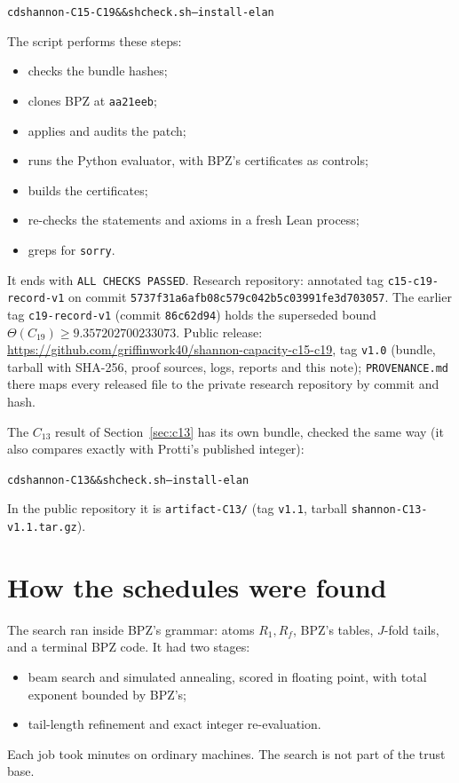 \documentclass[11pt]{amsart}
\newcommand{\T}{\Theta}
\newcommand{\code}[1]{\texttt{#1}}
\begin{document}
\begin{alltt}\small
cd shannon-C15-C19 && sh check.sh --install-elan
\end{alltt}
The script performs these steps:
\begin{itemize}
\item checks the bundle hashes;
\item clones BPZ at \code{aa21eeb};
\item applies and audits the patch;
\item runs the Python evaluator, with BPZ's certificates as controls;
\item builds the certificates;
\item re-checks the statements and axioms in a fresh Lean process;
\item greps for \code{sorry}.
\end{itemize}
It ends with \code{ALL CHECKS PASSED}. Research repository: annotated tag
\code{c15-c19-record-v1} on commit \code{5737f31a6afb08c579c042b5c03991fe3d703057}. The earlier
tag \code{c19-record-v1} (commit \code{86c62d94}) holds the superseded bound
$\T(C_{19})\ge 9.357202700233073$. Public release:
\url{https://github.com/griffinwork40/shannon-capacity-c15-c19}, tag \code{v1.0} (bundle, tarball
with SHA-256, proof sources, logs, reports and this note); \code{PROVENANCE.md} there maps every
released file to the private research repository by commit and hash.

The $C_{13}$ result of Section~\ref{sec:c13} has its own bundle, checked the same way (it also
compares exactly with Protti's published integer):
\begin{alltt}\small
cd shannon-C13 && sh check.sh --install-elan
\end{alltt}
In the public repository it is \code{artifact-C13/} (tag \code{v1.1}, tarball
\code{shannon-C13-v1.1.tar.gz}).

\section{How the schedules were found}\label{sec:method}

The search ran inside BPZ's grammar: atoms $R_1, R_f$, BPZ's tables, $J$-fold tails, and a
terminal BPZ code. It had two stages:
\begin{itemize}
\item beam search and simulated annealing, scored in floating point, with total exponent bounded
by BPZ's;
\item tail-length refinement and exact integer re-evaluation.
\end{itemize}
Each job took minutes on ordinary machines. The search is not part of the trust base.
\end{document}
